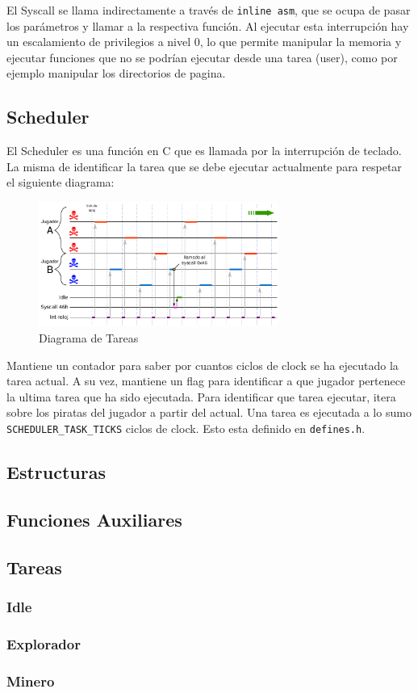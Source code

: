 El Syscall se llama indirectamente a través de \texttt{inline asm}, que se ocupa de pasar los parámetros y llamar a la respectiva función. Al ejecutar esta interrupción hay un escalamiento de privilegios a nivel 0, lo que permite manipular la memoria y ejecutar funciones que no se podrían ejecutar desde una tarea (user), como por ejemplo manipular los directorios de pagina.

\pagebreak

\subsection{Scheduler}

El Scheduler es una función en C que es llamada por la interrupción de teclado. La misma de identificar la tarea que se debe ejecutar actualmente para respetar el siguiente diagrama:

\begin{figure}[H]
  \centering
    \includegraphics[width=0.7\textwidth]{images/scheduler}
  \caption{Diagrama de Tareas}
\end{figure}

Mantiene un contador para saber por cuantos ciclos de clock se ha ejecutado la tarea actual. A su vez, mantiene un flag para identificar a que jugador pertenece la ultima tarea que ha sido ejecutada. Para identificar que tarea ejecutar, itera sobre los piratas del jugador a partir del actual. Una tarea es ejecutada a lo sumo \texttt{SCHEDULER\_TASK\_TICKS} ciclos de clock. Esto esta definido en \texttt{defines.h}.

\subsection{Estructuras}

\subsection{Funciones Auxiliares}

\subsection{Tareas}

\subsubsection{Idle}

\subsubsection{Explorador}

\subsubsection{Minero}
